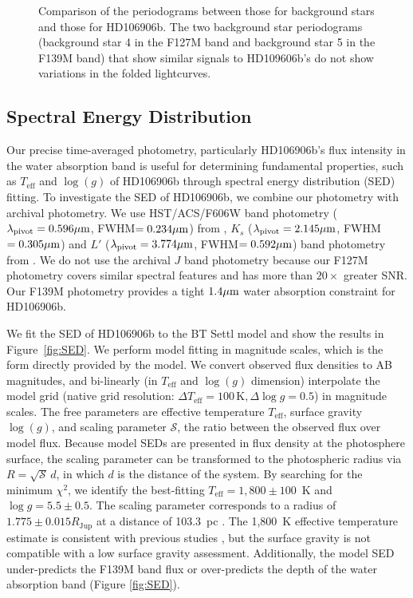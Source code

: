 \documentclass[twocolumn]{aastex62}
\newcommand{\teff}{\ensuremath{T_{\mathrm{eff}}}\xspace}
\newcommand{\logg}{\ensuremath{\log(g)}\xspace}
\begin{document}
\begin{figure}[!ht]
  \centering
  \caption[Comparison of the periodograms between those for background stars and those for HD106906b.]{Comparison of the periodograms between those for background stars and those for HD106906b. The two background star periodograms (background star 4 in the F127M band and background star 5 in the F139M band) that show similar signals to HD109606b's do not show variations in the folded lightcurves.}
  \label{fig:all-periodograms}
\end{figure}


\subsection{Spectral Energy Distribution}
Our precise time-averaged photometry, particularly HD106906b's flux intensity in the water absorption band is useful for determining fundamental properties, such as \teff{} and \logg{} of HD106906b through spectral energy distribution (SED) fitting.  To investigate the SED of HD106906b, we combine our photometry with archival photometry.  We use HST/ACS/F606W band photometry ($\lambda_{\mathrm{pivot}}=0.596\mbox{$\mu$m}$, FWHM$=0.234\mbox{$\mu$m}$) from \citet{Kalas2015}, $K_{s}$ ($\lambda_{\mathrm{pivot}}=2.145\mbox{$\mu$m}$, FWHM$=0.305\mbox{$\mu$m}$) and $L'$ ($\lambda_{\mathrm{pivot}}=3.774\mbox{$\mu$m}$, FWHM$=0.592\mbox{$\mu$m}$) band photometry from \citet{Bailey2013}. We do not use the archival $J$ band photometry \citep{Wu2016} because our F127M photometry covers similar spectral features and has more than $20\times$ greater SNR. Our F139M photometry provides a tight $1.4\mbox{$\mu$m}$ water absorption constraint for HD106906b.

We fit the SED of HD106906b to the BT Settl model \citep[][]{Allard2012} and show the results in Figure~\ref{fig:SED}. We perform model fitting in magnitude scales, which is the form directly provided by the model.  We convert observed flux {densities} to AB magnitudes, and bi-linearly (in \teff and \logg dimension) interpolate the model grid (native grid resolution: $\Delta \teff=100\,\mbox{K}, \Delta \log g=0.5$) in magnitude scales. The free parameters are effective temperature $\teff$, surface gravity $\logg$, and scaling parameter $\mathcal{S}$, the ratio between the observed flux over model flux. Because model SEDs are presented in flux {density} at the photosphere surface, the scaling parameter can be transformed to the photospheric radius via $R=\sqrt{\mathcal{S}}\,d$, in which $d$ is the distance of the system. By searching for the minimum $\chi^{2}$, we identify the best-fitting $T_{\mathrm{eff}}=1,800\pm100$~K and $\log g=5.5\pm0.5$.  The scaling parameter corresponds to a radius of  $1.775\pm0.015R_{\mathrm{Jup}}$ at a distance of 103.3~pc \citep{Gaia2018,Gaia2016}. The 1,800~K effective temperature estimate is consistent with previous studies \citep{Bailey2013,Wu2016}, but the surface gravity is not compatible with a low surface gravity assessment. Additionally, the model SED under-predicts the F139M band flux or over-predicts the depth of the water absorption band (Figure \ref{fig:SED}).
\end{document}
